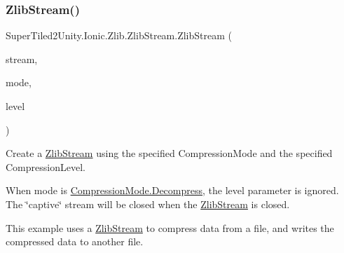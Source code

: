 \subsubsection{\texorpdfstring{Zlib\+Stream()}{ZlibStream()}\hspace{0.1cm}{\footnotesize\ttfamily [2/4]}}
{\footnotesize\ttfamily Super\+Tiled2\+Unity.\+Ionic.\+Zlib.\+Zlib\+Stream.\+Zlib\+Stream (\begin{DoxyParamCaption}\item[{System.\+I\+O.\+Stream}]{stream,  }\item[{\mbox{\hyperlink{namespace_super_tiled2_unity_1_1_ionic_1_1_zlib_ad5b7635d92497e1c905e5de82eb1c6b1}{Compression\+Mode}}}]{mode,  }\item[{\mbox{\hyperlink{namespace_super_tiled2_unity_1_1_ionic_1_1_zlib_a20f6771804996c363f454ad9765cd7db}{Compression\+Level}}}]{level }\end{DoxyParamCaption})}



Create a {\ttfamily \mbox{\hyperlink{class_super_tiled2_unity_1_1_ionic_1_1_zlib_1_1_zlib_stream}{Zlib\+Stream}}} using the specified {\ttfamily Compression\+Mode} and the specified {\ttfamily Compression\+Level}. 

When mode is {\ttfamily \mbox{\hyperlink{namespace_super_tiled2_unity_1_1_ionic_1_1_zlib_ad5b7635d92497e1c905e5de82eb1c6b1a6d2861192fdf4370bcf95c099be0f2f0}{Compression\+Mode.\+Decompress}}}, the level parameter is ignored. The \char`\"{}captive\char`\"{} stream will be closed when the {\ttfamily \mbox{\hyperlink{class_super_tiled2_unity_1_1_ionic_1_1_zlib_1_1_zlib_stream}{Zlib\+Stream}}} is closed. 

This example uses a {\ttfamily \mbox{\hyperlink{class_super_tiled2_unity_1_1_ionic_1_1_zlib_1_1_zlib_stream}{Zlib\+Stream}}} to compress data from a file, and writes the compressed data to another file.


